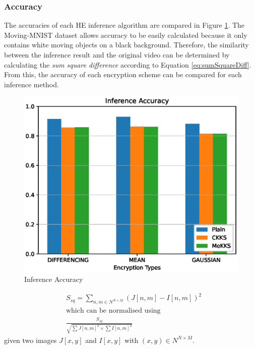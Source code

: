 \setlength{\leftskip}{0cm}
\subsubsection{Accuracy}
\setlength{\leftskip}{0.5cm}
\indent \indent
The accuracies of each HE inference algorithm are compared in Figure \ref{fig:accuracy}. The Moving-MNIST dataset allows accuracy to be easily calculated because it only contains white moving objects on a black background. Therefore, the similarity between the inference result and the original video can be determined by calculating the \textit{sum square difference} according to Equation \ref{eq:sumSquareDiff}. From this, the accuracy of each encryption scheme can be compared for each inference method.

\begin{figure}
    \centering
    \includegraphics[scale=0.8]{figures/accuracy.eps}
    \caption{Inference Accuracy}
    \label{fig:accuracy}
\end{figure}

\begin{equation}
    \label{eq:sumSquareDiff}
    \begin{split}
    &S_{sq} = \sum_{n,m \in N^{N \times M}} (J[n, m] - I[n, m])^2 \\
    &\textrm{which can be normalised using} \\
    &\frac{S_{sq}}{\sqrt{\sum J[n,m]^2 \times \sum I[n,m]^2}}
    \end{split}
\end{equation}
given two images $J[x,y]$ and $I[x,y]$ with $(x,y) \in N^{N \times M}$.

